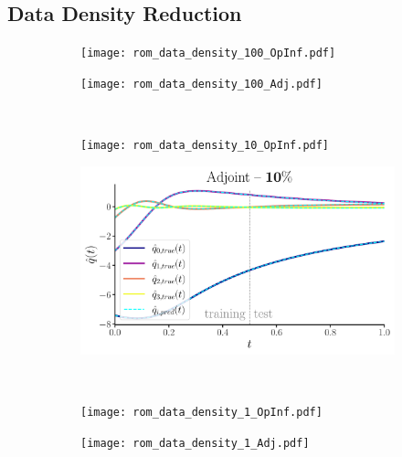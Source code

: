 \subsection*{Data Density Reduction}

\vspace{1.0cm}

\begin{figure}[h!]
  \centering
  \begin{subfigure}[c]{0.49\textwidth}
      \centering
      \texttt{[image: rom\_data\_density\_100\_OpInf.pdf]}
  \end{subfigure}
  \begin{subfigure}[c]{0.49\textwidth}
      \centering
      \texttt{[image: rom\_data\_density\_100\_Adj.pdf]}
  \end{subfigure} \\[1ex]
    
  \begin{subfigure}[c]{0.49\textwidth}
      \centering
      \texttt{[image: rom\_data\_density\_10\_OpInf.pdf]}
  \end{subfigure} 
  \begin{subfigure}[c]{0.49\textwidth}
      \centering
      \includegraphics[width=\linewidth]{figures/rom_data_density_10_Adj.pdf}
  \end{subfigure} \\[1ex]
    
  \begin{subfigure}[c]{0.49\textwidth}
      \centering
      \texttt{[image: rom\_data\_density\_1\_OpInf.pdf]}
  \end{subfigure} 
  \begin{subfigure}[c]{0.49\textwidth}
      \centering
      \texttt{[image: rom\_data\_density\_1\_Adj.pdf]}
  \end{subfigure} \\[1ex]
    

\end{figure}
